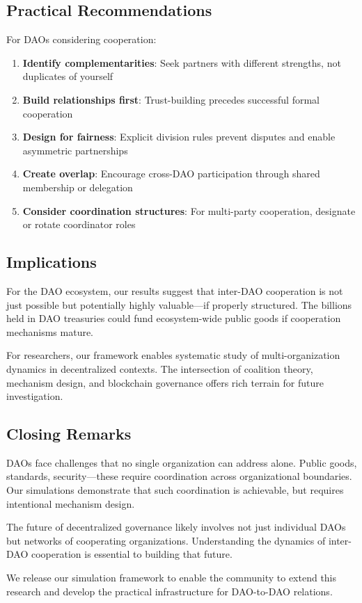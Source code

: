 \subsection{Practical Recommendations}

For DAOs considering cooperation:

\begin{enumerate}
    \item \textbf{Identify complementarities}: Seek partners with different strengths, not duplicates of yourself
    \item \textbf{Build relationships first}: Trust-building precedes successful formal cooperation
    \item \textbf{Design for fairness}: Explicit division rules prevent disputes and enable asymmetric partnerships
    \item \textbf{Create overlap}: Encourage cross-DAO participation through shared membership or delegation
    \item \textbf{Consider coordination structures}: For multi-party cooperation, designate or rotate coordinator roles
\end{enumerate}

\subsection{Implications}

For the DAO ecosystem, our results suggest that inter-DAO cooperation is not just possible but potentially highly valuable---if properly structured. The billions held in DAO treasuries could fund ecosystem-wide public goods if cooperation mechanisms mature.

For researchers, our framework enables systematic study of multi-organization dynamics in decentralized contexts. The intersection of coalition theory, mechanism design, and blockchain governance offers rich terrain for future investigation.

\subsection{Closing Remarks}

DAOs face challenges that no single organization can address alone. Public goods, standards, security---these require coordination across organizational boundaries. Our simulations demonstrate that such coordination is achievable, but requires intentional mechanism design.

The future of decentralized governance likely involves not just individual DAOs but networks of cooperating organizations. Understanding the dynamics of inter-DAO cooperation is essential to building that future.

We release our simulation framework to enable the community to extend this research and develop the practical infrastructure for DAO-to-DAO relations.
